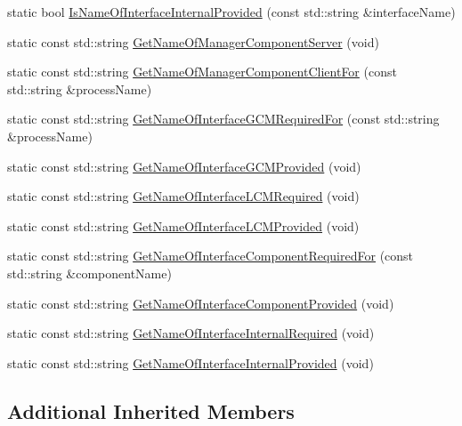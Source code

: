 \begin{DoxyCompactItemize}
\item 
static bool \hyperlink{classmts_manager_component_base_aad29ed7630db6bc4a37efe480945eda1}{Is\+Name\+Of\+Interface\+Internal\+Provided} (const std\+::string \&interface\+Name)
\item 
static const std\+::string \hyperlink{classmts_manager_component_base_ab6a169dbc07a54ad39a88323927d7284}{Get\+Name\+Of\+Manager\+Component\+Server} (void)
\item 
static const std\+::string \hyperlink{classmts_manager_component_base_a2bdf936f48e5b8ba961c1841dc74ab0f}{Get\+Name\+Of\+Manager\+Component\+Client\+For} (const std\+::string \&process\+Name)
\item 
static const std\+::string \hyperlink{classmts_manager_component_base_a19f5e7676b8db2b0a8e7624f26bbc56d}{Get\+Name\+Of\+Interface\+G\+C\+M\+Required\+For} (const std\+::string \&process\+Name)
\item 
static const std\+::string \hyperlink{classmts_manager_component_base_a0e87161298f11e2e26132f382d4b8773}{Get\+Name\+Of\+Interface\+G\+C\+M\+Provided} (void)
\item 
static const std\+::string \hyperlink{classmts_manager_component_base_a2d1b7cd5ead97d34b407aaf6cd4e1090}{Get\+Name\+Of\+Interface\+L\+C\+M\+Required} (void)
\item 
static const std\+::string \hyperlink{classmts_manager_component_base_aa1e667346d1846bc5213772ff3dedf11}{Get\+Name\+Of\+Interface\+L\+C\+M\+Provided} (void)
\item 
static const std\+::string \hyperlink{classmts_manager_component_base_a7daa8255953c4e386dc152b7caa1160c}{Get\+Name\+Of\+Interface\+Component\+Required\+For} (const std\+::string \&component\+Name)
\item 
static const std\+::string \hyperlink{classmts_manager_component_base_aabbab31ba72a7f8a8c3b4bb823fabb3d}{Get\+Name\+Of\+Interface\+Component\+Provided} (void)
\item 
static const std\+::string \hyperlink{classmts_manager_component_base_a4f0da48295f4835382d2505e5433eff9}{Get\+Name\+Of\+Interface\+Internal\+Required} (void)
\item 
static const std\+::string \hyperlink{classmts_manager_component_base_a6d1c901c5cdf7902edee5ec5cd477f69}{Get\+Name\+Of\+Interface\+Internal\+Provided} (void)
\end{DoxyCompactItemize}
\subsection*{Additional Inherited Members}


